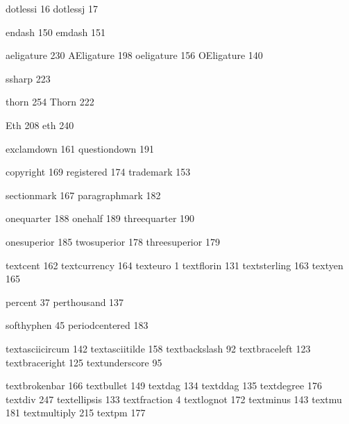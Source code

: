  dotlessi          16 %
 dotlessj          17

 endash           150 %
 emdash           151 %

 aeligature       230
 AEligature       198
 oeligature       156
 OEligature       140

 ssharp           223

 thorn            254
 Thorn            222

 Eth              208
 eth              240

 exclamdown       161
 questiondown     191

 copyright        169
 registered       174
 trademark        153

 sectionmark      167
 paragraphmark    182

 onequarter       188
 onehalf          189
 threequarter     190

 onesuperior      185
 twosuperior      178
 threesuperior    179

 textcent         162 %
 textcurrency     164 
 texteuro           1
 textflorin       131
 textsterling     163
 textyen          165 

 percent           37
 perthousand      137

 softhyphen        45 
 periodcentered   183

 textasciicircum  142 
 textasciitilde   158
 textbackslash     92  
 textbraceleft    123 
 textbraceright   125 
 textunderscore    95

 textbrokenbar    166 
 textbullet       149
 textdag          134
 textddag         135
 textdegree       176 
 textdiv          247
 textellipsis     133
 textfraction       4
 textlognot       172
 textminus        143
 textmu           181
 textmultiply     215
 textpm           177

